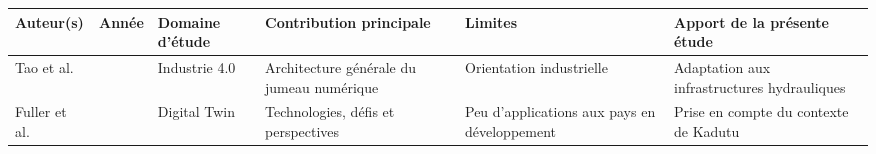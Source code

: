 \begin{longtable}[]{@{}
		>{\raggedright\arraybackslash}p{}
		>{\raggedright\arraybackslash}p{}
		>{\raggedright\arraybackslash}p{}
		>{\raggedright\arraybackslash}p{}
		>{\raggedright\arraybackslash}p{}
		>{\raggedright\arraybackslash}p{}@{}}
	\toprule
	Auteur(s) & Année & Domaine d'étude & Contribution principale &
	Limites & Apport de la présente étude \\
	\midrule
	\endhead
	
	Tao et al. & 2019 & Industrie 4.0 &
	Architecture générale du jumeau numérique &
	Orientation industrielle &
	Adaptation aux infrastructures hydrauliques \\
	
	Fuller et al. & 2020 & Digital Twin &
	Technologies, défis et perspectives &
	Peu d'applications aux pays en développement &
	Prise en compte du contexte de Kadutu \\
	
	\bottomrule
\end{longtable}
